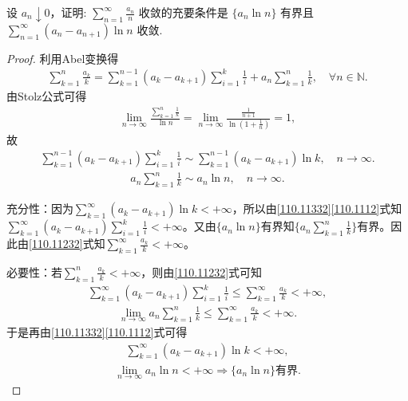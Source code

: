 \documentclass[../../main.tex]{subfiles}
\begin{document}
\begin{example}
设 \( a_n \downarrow 0 \)，证明: \( \sum_{n=1}^{\infty} \frac{a_n}{n} \) 收敛的充要条件是 \( \{a_n \ln n\} \) 有界且 \( \sum_{n=1}^{\infty} (a_n - a_{n+1}) \ln n \) 收敛.
\end{example}
\begin{proof}
利用Abel变换得
\begin{align}
\sum_{k=1}^n{\frac{a_k}{k}}=\sum_{k=1}^{n-1}{\left( a_k-a_{k+1} \right) \sum_{i=1}^k{\frac{1}{i}}}+a_n\sum_{k=1}^n{\frac{1}{k}},\quad \forall n\in \mathbb{N} . \label{110.11232}
\end{align}
由Stolz公式可得
\begin{align*}
\lim_{n\rightarrow \infty}\frac{\sum\limits_{k=1}^n{\frac{1}{k}}}{\ln n}=\lim_{n\rightarrow \infty}\frac{\frac{1}{n+1}}{\ln \left( 1+\frac{1}{n} \right)}=1,
\end{align*}
故
\begin{align}
\sum_{k=1}^{n-1}{\left( a_k-a_{k+1} \right) \sum_{i=1}^k{\frac{1}{i}}}\sim \sum_{k=1}^{n-1}{\left( a_k-a_{k+1} \right) \ln k},\quad n\rightarrow \infty . \label{110.11332}
\end{align}
\begin{align}
a_n\sum_{k=1}^n{\frac{1}{k}}\sim a_n\ln n,\quad n\rightarrow \infty . \label{110.1112}
\end{align}

{\heiti 充分性}：因为$\sum_{k=1}^{\infty}{\left( a_k-a_{k+1} \right) \ln k}<+\infty$，所以由\eqref{110.11332}\eqref{110.1112}式知$\sum_{k=1}^{\infty}{\left( a_k-a_{k+1} \right) \sum_{i=1}^k{\frac{1}{i}}}<+\infty$。又由$\{ a_n\ln n \}$有界知$\{ a_n\sum_{k=1}^n{\frac{1}{k}} \}$有界。因此由\eqref{110.11232}式知$\sum_{k=1}^{\infty}{\frac{a_k}{k}}<+\infty$。

{\heiti 必要性}：若$\sum_{k=1}^n{\frac{a_k}{k}}<+\infty$，则由\eqref{110.11232}式可知
\begin{align*}
\sum_{k=1}^{\infty}{\left( a_k-a_{k+1} \right) \sum_{i=1}^k{\frac{1}{i}}}\leqslant \sum_{k=1}^{\infty}{\frac{a_k}{k}}<+\infty ,
\end{align*}
\begin{align*}
\lim_{n\rightarrow \infty}a_n\sum_{k=1}^n{\frac{1}{k}}\leqslant \sum_{k=1}^{\infty}{\frac{a_k}{k}}<+\infty .
\end{align*}
于是再由\eqref{110.11332}\eqref{110.1112}式可得
\begin{align*}
\sum_{k=1}^{\infty}{\left( a_k-a_{k+1} \right) \ln k}<+\infty ,
\end{align*}
\begin{align*}
\lim_{n\rightarrow \infty}a_n\ln n<+\infty \Longrightarrow \{ a_n\ln n \} \text{有界}.
\end{align*}
\end{proof}
\end{document}
